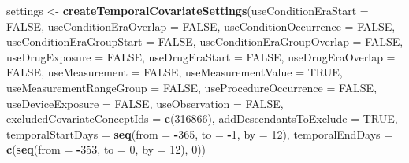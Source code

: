 \documentclass[]{article}
\newenvironment{Shaded}{\begin{snugshade}}{\end{snugshade}}
\newcommand{\KeywordTok}[1]{\textcolor[rgb]{0.13,0.29,0.53}{\textbf{#1}}}
\newcommand{\DataTypeTok}[1]{\textcolor[rgb]{0.13,0.29,0.53}{#1}}
\newcommand{\DecValTok}[1]{\textcolor[rgb]{0.00,0.00,0.81}{#1}}
\newcommand{\StringTok}[1]{\textcolor[rgb]{0.31,0.60,0.02}{#1}}
\newcommand{\OtherTok}[1]{\textcolor[rgb]{0.56,0.35,0.01}{#1}}
\newcommand{\OperatorTok}[1]{\textcolor[rgb]{0.81,0.36,0.00}{\textbf{#1}}}
\newcommand{\NormalTok}[1]{#1}
\begin{document}
\begin{Shaded}
\begin{Highlighting}[]
\NormalTok{settings <-}\StringTok{ }\KeywordTok{createTemporalCovariateSettings}\NormalTok{(}\DataTypeTok{useConditionEraStart =} \OtherTok{FALSE}\NormalTok{,}
                                            \DataTypeTok{useConditionEraOverlap =} \OtherTok{FALSE}\NormalTok{,}
                                            \DataTypeTok{useConditionOccurrence =} \OtherTok{FALSE}\NormalTok{,}
                                            \DataTypeTok{useConditionEraGroupStart =} \OtherTok{FALSE}\NormalTok{,}
                                            \DataTypeTok{useConditionEraGroupOverlap =} \OtherTok{FALSE}\NormalTok{,}
                                            \DataTypeTok{useDrugExposure =} \OtherTok{FALSE}\NormalTok{,}
                                            \DataTypeTok{useDrugEraStart =} \OtherTok{FALSE}\NormalTok{,}
                                            \DataTypeTok{useDrugEraOverlap =} \OtherTok{FALSE}\NormalTok{,}
                                            \DataTypeTok{useMeasurement =} \OtherTok{FALSE}\NormalTok{,}
                                            \DataTypeTok{useMeasurementValue =} \OtherTok{TRUE}\NormalTok{,}
                                            \DataTypeTok{useMeasurementRangeGroup =} \OtherTok{FALSE}\NormalTok{,}
                                            \DataTypeTok{useProcedureOccurrence =} \OtherTok{FALSE}\NormalTok{,}
                                            \DataTypeTok{useDeviceExposure =} \OtherTok{FALSE}\NormalTok{,}
                                            \DataTypeTok{useObservation =} \OtherTok{FALSE}\NormalTok{,}
                                            \DataTypeTok{excludedCovariateConceptIds =} \KeywordTok{c}\NormalTok{(}\DecValTok{316866}\NormalTok{),}
                                            \DataTypeTok{addDescendantsToExclude =} \OtherTok{TRUE}\NormalTok{,}
                                            \DataTypeTok{temporalStartDays =} \KeywordTok{seq}\NormalTok{(}\DataTypeTok{from =} \OperatorTok{-}\DecValTok{365}\NormalTok{, }
                                                                    \DataTypeTok{to =} \OperatorTok{-}\DecValTok{1}\NormalTok{, }\DataTypeTok{by =} \DecValTok{12}\NormalTok{), }
                                            \DataTypeTok{temporalEndDays =} \KeywordTok{c}\NormalTok{(}\KeywordTok{seq}\NormalTok{(}\DataTypeTok{from =} \OperatorTok{-}\DecValTok{353}\NormalTok{, }
                                                                    \DataTypeTok{to =} \DecValTok{0}\NormalTok{, }\DataTypeTok{by =} \DecValTok{12}\NormalTok{), }\DecValTok{0}\NormalTok{))}


\end{Highlighting}
\end{Shaded}
\end{document}
